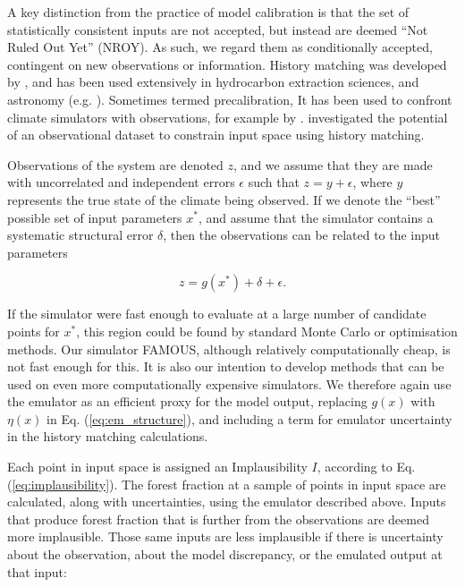 \documentclass[esd, article]{copernicus} %
\begin{document}
A key distinction from the practice of model calibration is that the set of statistically consistent inputs are not accepted, but instead are deemed ``Not Ruled Out Yet'' (NROY). As such, we regard them as conditionally accepted, contingent on new observations or information. History matching was developed by \cite{craig1997pressure}, and has been used extensively in hydrocarbon extraction sciences, and astronomy (e.g. \cite{vernon2010galaxy}). Sometimes termed precalibration, It has been used to confront climate simulators with observations, for example by \cite{lee2016aerosol, williamson2013history, holden2009precalibration}. \cite{mcneall2013potential} investigated the potential of an observational dataset to constrain input space using history matching.

Observations of the system are denoted $z$, and we assume that they are made with uncorrelated and independent errors $\epsilon$ such that $z=y+\epsilon$, where $y$ represents the true state of the climate being observed. If we denote the ``best'' possible set of input parameters $x^{*}$, and assume that the simulator contains a systematic structural error $\delta$, then the observations can be related to the input parameters

\begin{equation}\label{eq:em_structure}
z=g(x^*) + \delta + \epsilon.
\end{equation}

If the simulator were fast enough to evaluate at a large number of candidate points for $x^{*}$, this region could be found by standard Monte Carlo or optimisation methods. Our simulator FAMOUS, although relatively computationally cheap, is not fast enough for this. It is also our intention to develop methods that can be used on even more computationally expensive simulators. We therefore again use the emulator as an efficient proxy for the model output, replacing $g(x)$ with $\eta(x)$ in Eq. (\ref{eq:em_structure}), and including a term for emulator uncertainty in the history matching calculations.

Each point in input space is assigned an Implausibility $I$, according to Eq. (\ref{eq:implausibility}). The forest fraction at a sample of points in input space are calculated, along with uncertainties, using the emulator described above. Inputs that produce forest fraction that is further from the observations are deemed more implausible. Those same inputs are less implausible if there is uncertainty about the observation, about the model discrepancy, or the emulated output at that input:
\end{document}
